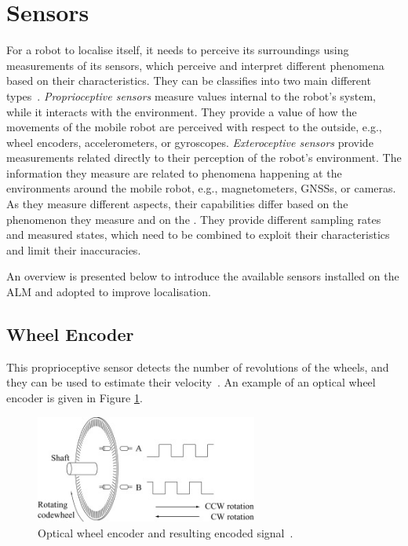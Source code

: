 \section{Sensors}
\noindent For a robot to localise itself, it needs to perceive its surroundings using measurements of its sensors, which perceive and interpret different phenomena based on their characteristics.
They can be classifies into two main different types~\cite{perception}.
\textit{Proprioceptive sensors} measure values internal to the robot's system, while it interacts with the environment. They provide a value of how the movements of the mobile robot are perceived with respect to the outside, e.g., wheel encoders, accelerometers, or gyroscopes.
\textit{Exteroceptive sensors} provide measurements related directly to their perception of the robot's environment. The information they measure are related to phenomena happening at the environments around the mobile robot, e.g., magnetometers, \glspl{GNSS}, or cameras.
As they measure different aspects, their capabilities differ based on the phenomenon they measure and on the .
They provide different sampling rates and measured states, which need to be combined to exploit their characteristics and limit their inaccuracies.

An overview is presented below to introduce the available sensors installed on the \gls{ALM} and adopted to improve localisation.

\subsection{Wheel Encoder}

\noindent This proprioceptive sensor detects the number of revolutions of the wheels, and they can be used to estimate their velocity~\cite{encoder}. An example of an optical wheel encoder is given in Figure \ref{fig:encoder}.
\begin{figure}[!ht]
  \begin{center}
    \includegraphics[width=0.65\textwidth]{Images/2-Background/Enc.jpg}
  \end{center}
  \caption{Optical wheel encoder and resulting encoded signal~\cite{wheelEncoder}.}
  \label{fig:encoder}
\end{figure}

